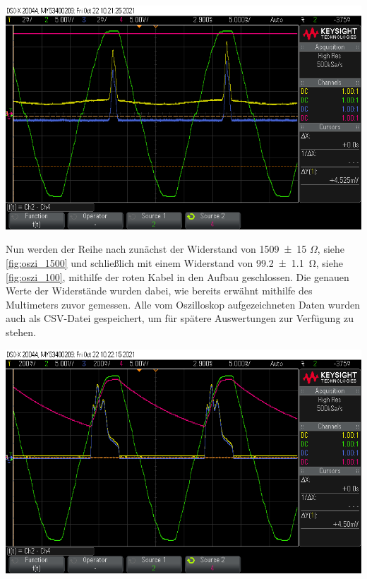 \documentclass[11pt,ngerman]{scrartcl}
\begin{document}
\begin{center}
	\begin{minipage}[t]{0.8\textwidth}
		\includegraphics[width=\textwidth]{Halbleiter/scope_2}
		\label{fig:oszi_ohne}
	\end{minipage}
\end{center}

Nun werden der Reihe nach zunächst der Widerstand von \SI{1509(15)}{} $\Omega$,
siehe \autoref{fig:oszi_1500} und schließlich mit einem Widerstand von
\SI{99.2(11)}{\ohm}, siehe \autoref{fig:oszi_100}, mithilfe der roten
Kabel in den Aufbau geschlossen. Die genauen Werte der Widerstände wurden
dabei, wie bereits erwähnt mithilfe des Multimeters zuvor gemessen. Alle vom
Oszilloskop aufgezeichneten Daten wurden auch als CSV-Datei gespeichert, um für
spätere Auswertungen zur Verfügung zu stehen.

\begin{center}
	\begin{minipage}[t]{0.8\textwidth}
		\includegraphics[width=\textwidth]{Halbleiter/scope_3}
		\label{fig:oszi_1500}
	\end{minipage}
\end{center}
\end{document}
